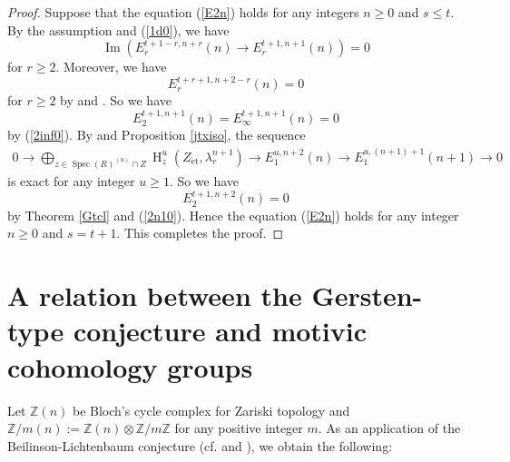 \documentclass{article}
\newcommand{\spec}{\operatorname{Spec}}
\newcommand{\et}{\mathrm{\acute{e}t}}
\newcommand{\HO}{\operatorname{H}}
\begin{document}
\begin{proof}
Suppose that the equation (\ref{E2n}) holds for any integers $n\geq 0$ and $s\leq t$.
By the assumption and (\ref{1d0}), we have
%
\begin{equation*}
\operatorname{Im}\left(
E^{t+1-r, n+r}_{r}(n)
\to
E^{t+1, n+1}_{r}(n)
\right)
=0
\end{equation*}
%
for $r\geq 2$. Moreover, we have
%
\begin{equation*}
E^{t+r+1, n+2-r}_{r}(n)=0    
\end{equation*}
%
for $r\geq 2$ by \cite[p.540, Theorem 4.4.7]{SaP} 
and \cite[Theorem 2.7]{Sak4}. 
So we have
%
\begin{equation}\label{2n10}
E_{2}^{t+1, n+1}(n)
=
E_{\infty}^{t+1, n+1}(n)
=0
\end{equation}
%
by (\ref{2inf0}). 
By \cite[Theorem 1.3]{Sak5} and Proposition \ref{jtxiso}, 
the sequence
%
\begin{align*}
0\to 
\displaystyle\bigoplus_{z\in\spec(R)^{(u)}\cap Z}
\HO_{z}^{u}(Z_{\et}, \lambda_{r}^{n+1})
\to
E_{1}^{u, n+2}(n)
\to
E_{1}^{u, (n+1)+1}(n+1)
\to
0
\end{align*}
%
is exact for any integer $u\geq 1$. So we have
%
\begin{equation*}
E^{t+1, n+2}_{2}(n)=0    
\end{equation*}
%
by Theorem \ref{Gtcl}  and (\ref{2n10}). 
Hence the equation (\ref{E2n}) holds 
for any integer $n\geq 0$ and $s=t+1$.
This completes the proof.
\end{proof}
%


\section{A relation between the Gersten-type conjecture and motivic cohomology groups}\label{TrelGtM}

Let $\mathbb{Z}(n)$ be Bloch's cycle complex for Zariski topology and
$\mathbb{Z}/m(n):=\mathbb{Z}(n)\otimes \mathbb{Z}/m\mathbb{Z}$
for any positive integer $m$. 
As
an application of the Beilinson-Lichtenbaum conjecture (cf. \cite[p.774, Theorem 1.2.2]{Ge} and \cite{V2}),
we obtain the following:
\end{document}
